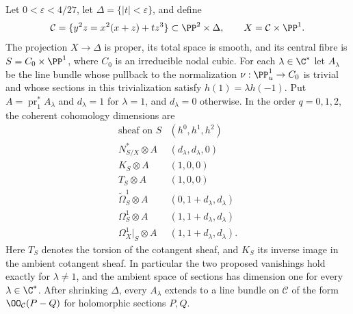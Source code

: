 
\begin{proposition}\label{cdp:st:B1}
Let $0<\varepsilon<4/27$, let $\Delta=\{|t|<\varepsilon\}$, and define
\[
 \mathcal C=\{y^2z=x^2(x+z)+tz^3\}\subset\PP^2\times\Delta,
 \qquad X=\mathcal C\times\PP^1.
\]
The projection $X\to\Delta$ is proper, its total space is smooth, and its central fibre is $S=C_0\times\PP^1$, where $C_0$ is an irreducible nodal cubic. For each $\lambda\in\C^*$ let $A_\lambda$ be the line bundle whose pullback to the normalization $\nu:\PP^1_u\to C_0$ is trivial and whose sections in this trivialization satisfy $h(1)=\lambda h(-1)$. Put $A=\operatorname{pr}_1^*A_\lambda$ and $d_\lambda=1$ for $\lambda=1$, and $d_\lambda=0$ otherwise. In the order $q=0,1,2$, the coherent cohomology dimensions are
\[
\begin{array}{c|c}
\text{sheaf on }S & (h^0,h^1,h^2)\\\hline
 N^*_{S/X}\otimes A &(d_\lambda,d_\lambda,0)\\
 K_S\otimes A &(1,0,0)\\
 T_S\otimes A &(1,0,0)\\
 \widetilde\Omega^1_S\otimes A &(0,1+d_\lambda,d_\lambda)\\
 \Omega^1_S\otimes A &(1,1+d_\lambda,d_\lambda)\\
 \Omega^1_X|_S\otimes A &(1,1+d_\lambda,d_\lambda).
\end{array}                                                    \tag{B.1}\label{cdp:eq:B.1}
\]
Here $T_S$ denotes the torsion of the cotangent sheaf, and $K_S$ its inverse image in the ambient cotangent sheaf. In particular the two proposed vanishings hold exactly for $\lambda\ne1$, and the ambient space of sections has dimension one for every $\lambda\in\C^*$. After shrinking $\Delta$, every $A_\lambda$ extends to a line bundle on $\mathcal C$ of the form $\OO_{\mathcal C}(P-Q)$ for holomorphic sections $P,Q$.
\end{proposition}

